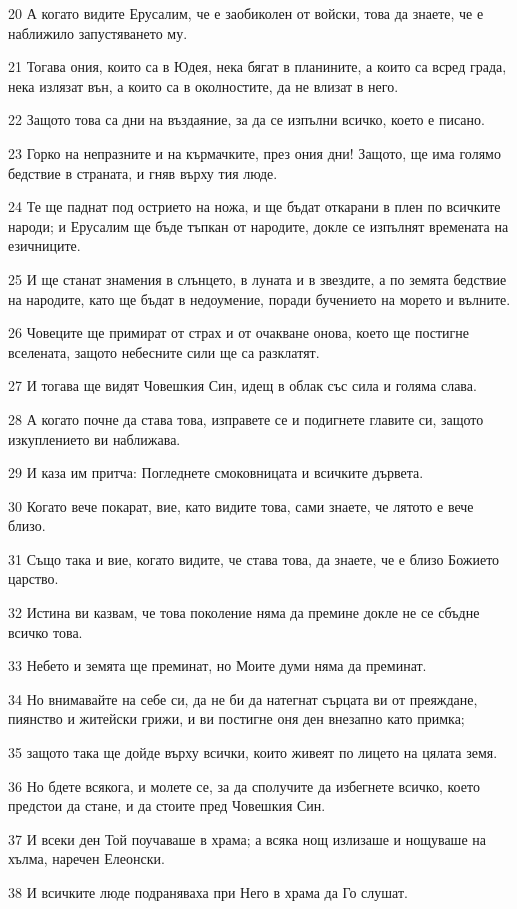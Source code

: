 \par 20 А когато видите Ерусалим, че е заобиколен от войски, това да знаете, че е наближило запустяването му.
\par 21 Тогава ония, които са в Юдея, нека бягат в планините, а които са всред града, нека излязат вън, а които са в околностите, да не влизат в него.
\par 22 Защото това са дни на въздаяние, за да се изпълни всичко, което е писано.
\par 23 Горко на непразните и на кърмачките, през ония дни! Защото, ще има голямо бедствие в страната, и гняв върху тия люде.
\par 24 Те ще паднат под острието на ножа, и ще бъдат откарани в плен по всичките народи; и Ерусалим ще бъде тъпкан от народите, докле се изпълнят времената на езичниците.
\par 25 И ще станат знамения в слънцето, в луната и в звездите, а по земята бедствие на народите, като ще бъдат в недоумение, поради бучението на морето и вълните.
\par 26 Човеците ще примират от страх и от очакване онова, което ще постигне вселената, защото небесните сили ще са разклатят.
\par 27 И тогава ще видят Човешкия Син, идещ в облак със сила и голяма слава.
\par 28 А когато почне да става това, изправете се и подигнете главите си, защото изкуплението ви наближава.
\par 29 И каза им притча: Погледнете смоковницата и всичките дървета.
\par 30 Когато вече покарат, вие, като видите това, сами знаете, че лятото е вече близо.
\par 31 Също така и вие, когато видите, че става това, да знаете, че е близо Божието царство.
\par 32 Истина ви казвам, че това поколение няма да премине докле не се сбъдне всичко това.
\par 33 Небето и земята ще преминат, но Моите думи няма да преминат.
\par 34 Но внимавайте на себе си, да не би да натегнат сърцата ви от преяждане, пиянство и житейски грижи, и ви постигне оня ден внезапно като примка;
\par 35 защото така ще дойде върху всички, които живеят по лицето на цялата земя.
\par 36 Но бдете всякога, и молете се, за да сполучите да избегнете всичко, което предстои да стане, и да стоите пред Човешкия Син.
\par 37 И всеки ден Той поучаваше в храма; а всяка нощ излизаше и нощуваше на хълма, наречен Елеонски.
\par 38 И всичките люде подраняваха при Него в храма да Го слушат.

